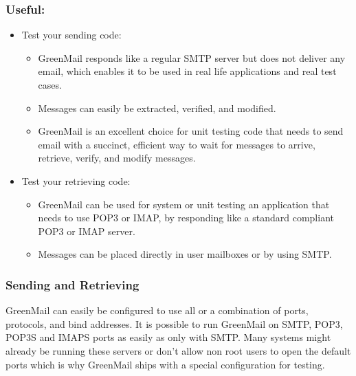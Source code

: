 \subsubsection{Useful:}
\begin{itemize}
\item{}Test your sending code: 
\begin{itemize}
\item{}GreenMail responds like a regular SMTP server but does not deliver any email, which enables it to be used in real life applications and real test cases. 
\item{}Messages can easily be extracted, verified, and modified. 
\item{}GreenMail is an excellent choice for unit testing code that needs to send email with a succinct, efficient way to wait for messages to arrive, retrieve, verify, and modify messages. 
\end{itemize}
\item{}Test your retrieving code: 
\begin{itemize}
\item{}GreenMail can be used for system or unit testing an application that needs to use POP3 or IMAP, by responding like a standard compliant POP3 or IMAP server. 
\item{}Messages can be placed directly in user mailboxes or by using SMTP.
\end{itemize}
\end{itemize}

\subsubsection{Sending and Retrieving}
GreenMail can easily be configured to use all or a combination of ports, protocols, and bind addresses. It  is possible to run GreenMail on SMTP, POP3, POP3S and IMAPS ports as easily as only with SMTP. Many systems might already be running these servers or don’t allow non root users to open the default ports which is why GreenMail ships with a special configuration for testing.